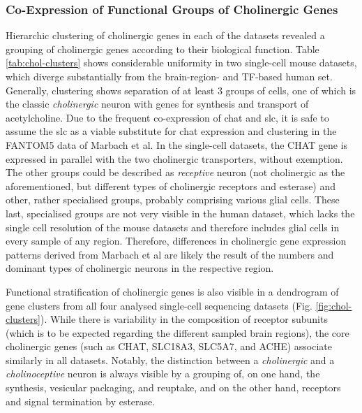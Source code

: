 \subsubsection{Co-Expression of Functional Groups of Cholinergic Genes}
Hierarchic clustering of cholinergic genes in each of the datasets revealed a grouping of cholinergic genes according to their biological function. Table \ref{tab:chol-clusters} shows considerable uniformity in two single-cell mouse datasets, which diverge substantially from the brain-region- and TF-based human set. Generally, clustering shows separation of at least 3 groups of cells, one of which is the classic \emph{cholinergic} neuron with genes for synthesis and transport of acetylcholine. Due to the frequent co-expression of \ac{chat} and \ac{slc}, it is safe to assume the \ac{slc} as a viable substitute for chat expression and clustering in the FANTOM5 data of Marbach et al. In the single-cell datasets, the CHAT gene is expressed in parallel with the two cholinergic transporters, without exemption. The other groups could be described as \emph{receptive} neuron (not cholinergic as the aforementioned, but different types of cholinergic receptors and esterase) and other, rather specialised groups, probably comprising various glial cells. These last, specialised groups are not very visible in the human dataset, which lacks the single cell resolution of the mouse datasets and therefore includes glial cells in every sample of any region. Therefore, differences in cholinergic gene expression patterns derived from Marbach et al are likely the result of the numbers and dominant types of cholinergic neurons in the respective region.

Functional stratification of cholinergic genes is also visible in a dendrogram of gene clusters from all four analysed single-cell sequencing datasets (Fig. \ref{fig:chol-clusters}). While there is variability in the composition of receptor subunits (which is to be expected regarding the different sampled brain regions), the core cholinergic genes (such as CHAT, SLC18A3, SLC5A7, and ACHE) associate similarly in all datasets. Notably, the distinction between a \emph{cholinergic} and a \emph{cholinoceptive} neuron is always visible by a grouping of, on one hand, the synthesis, vesicular packaging, and reuptake, and on the other hand, receptors and signal termination by esterase.

